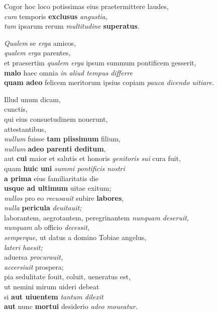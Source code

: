 \documentclass[a5paper,twoside]{article}
\renewenvironment{quote}
               {\list{}{\rightmargin 0mm
                \leftmargin 7mm
                \itemindent 0em}%
                \item\relax}
               {\endlist}
\begin{document}
\begin{quote}
\begin{latin}

Cogor hoc loco potissimas eius praetermittere laudes, \\
\textit{cum} temporis \textbf{exclusus} \textit{angustia,} \\
\textit{tum} ipsarum rerum \textit{multitudine} \textbf{superatus}.

\textit{Qualem} se \textit{erga} amicos, \\
\textit{qualem erga} parentes, \\
et praesertim \textit{qualem erga} ipsum summum pontificem gesserit, \\
\textbf{malo} haec omnia \textit{in aliud tempus differre} \\
\textbf{quam adeo} felicem meritorum ipsius copiam \textit{pauca dicendo uitiare.}   

Illud unum dicam, \\
cunctis, \\
qui eius consuetudinem nouerunt, \\
attestantibus, \\
\textit{nullum} fuisse \textbf{tam piissimum} filium, \\
\textit{nullum} \textbf{adeo parenti deditum}, \\
aut \textbf{cui} maior et salutis et honoris \textit{genitoris sui} cura fuit, \\
quam \textbf{huic uni} \textit{summi pontificis nostri} \\
\tabto{2em} \textbf{a prima} eius familiaritatis die \\
\tabto{2em} \textbf{usque ad ultimum} uitae exitum; \\
\textit{nullos} pro eo \textit{recusauit} subire \textbf{labores}, \\
\textit{nulla} \textbf{pericula} \textit{deuitauit;} \\
laborantem, aegrotantem, peregrinantem \textit{nunquam deseruit,} \\
\textit{nunquam} ab officio \textit{decessit,} \\
\textit{semperque,} ut datus a domino Tobiae angelus, \\
\textit{lateri haesit;} \\
aduersa \textit{procurauit,} \\
\textit{accersiuit} prospera; \\
pia sedulitate fouit, coluit, ueneratus est, \\
ut nemini mirum uideri debeat \\
si \textbf{aut uiuentem} \textit{tantum dilexit} \\
\textbf{aut} nunc \textbf{mortui} desiderio \textit{adeo moueatur.}

\end{latin}
\end{quote}
\end{document}
